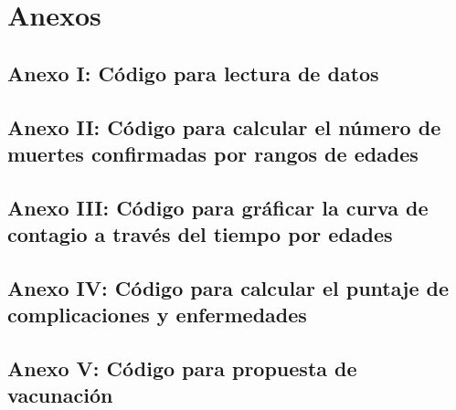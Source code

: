 \documentclass[12pt,a4paper]{article}
\begin{document}
\section{Anexos}

\subsection{Anexo I: Código para lectura de datos}

\subsection{Anexo II: Código para calcular el número de muertes confirmadas por rangos de edades}
\subsection{Anexo III: Código para gráficar la curva de contagio a través del tiempo por edades}
\subsection{Anexo IV: Código para calcular el puntaje de complicaciones y enfermedades}
\subsection{Anexo V: Código para propuesta de vacunación}
\end{document}

